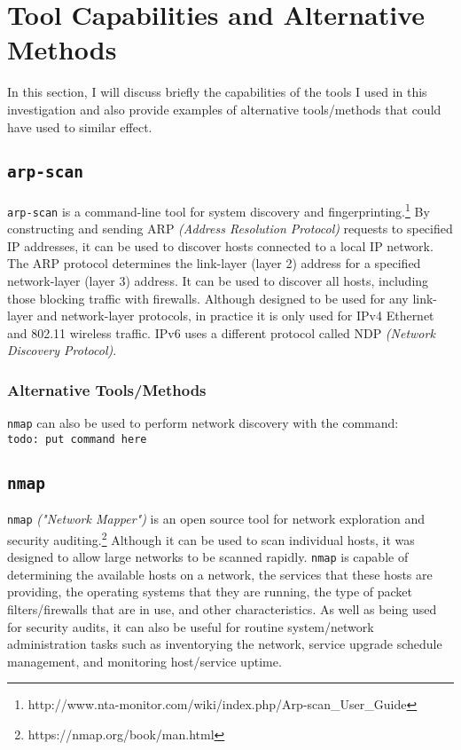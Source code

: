 \documentclass[12pt]{report}
\newcommand{\term}[1]{\colorbox{light-gray}{\texttt{#1}}}
\begin{document}
\pagebreak
\chapter{Tool Capabilities and Alternative Methods}
In this section, I will discuss briefly the capabilities of the tools I used in this investigation and also provide examples of alternative tools/methods that could have used to similar effect.

\section{\texttt{arp-scan}}
\texttt{arp-scan} is a command-line tool for system discovery and fingerprinting.\footnote{http://www.nta-monitor.com/wiki/index.php/Arp-scan\_User\_Guide} By constructing and sending ARP \textit{(Address Resolution Protocol)} requests to specified IP addresses, it can be used to discover hosts connected to a local IP network. The ARP protocol determines the link-layer (layer 2) address for a specified network-layer (layer 3) address. It can be used to discover all hosts, including those blocking traffic with firewalls. Although designed to be used for any link-layer and network-layer protocols, in practice it is only used for IPv4 Ethernet and 802.11 wireless traffic. IPv6 uses a different protocol called NDP \textit{(Network Discovery Protocol)}.
\subsection*{Alternative Tools/Methods}
\texttt{nmap} can also be used to perform network discovery with the command:\\
\term{todo: put command here}

\section{\texttt{nmap}}
\texttt{nmap} \textit{("Network Mapper")} is an open source tool for network exploration and security auditing.\footnote{https://nmap.org/book/man.html} Although it can be used to scan individual hosts, it was designed to allow large networks to be scanned rapidly. \texttt{nmap} is capable of determining the available hosts on a network, the services that these hosts are providing, the operating systems that they are running, the type of packet filters/firewalls that are in use, and other characteristics. As well as being used for security audits, it can also be useful for routine system/network administration tasks such as inventorying the network, service upgrade schedule management, and monitoring host/service uptime.
\end{document}
